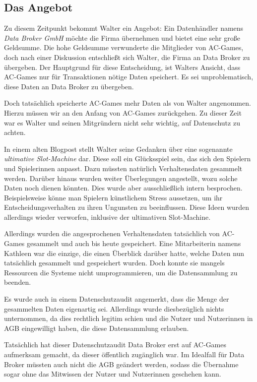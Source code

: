 \subsection{Das Angebot}

Zu diesem Zeitpunkt bekommt Walter ein Angebot:
Ein Datenhändler namens \emph{Data Broker GmbH} möchte die Firma übernehmen und bietet eine sehr große Geldsumme.
Die hohe Geldsumme verwunderte die Mitglieder von AC-Games,
doch nach einer Diskussion entschließt sich Walter, die Firma an Data Broker zu übergeben.
Der Hauptgrund für diese Entscheidung, ist Walters Ansicht, dass AC-Games nur für Transaktionen nötige Daten speichert.
Es sei unproblematisch, diese Daten an Data Broker zu übergeben.

Doch tatsächlich speicherte AC-Games mehr Daten als von Walter angenommen.
Hierzu müssen wir an den Anfang von AC-Games zurückgehen.
Zu dieser Zeit war es Walter und seinen Mitgründern nicht sehr wichtig, auf Datenschutz zu achten.

In einem alten Blogpost stellt Walter seine Gedanken über eine sogenannte \emph{ultimative Slot-Machine} dar.
Diese soll ein Glücksspiel sein, das sich den Spielern und Spielerinnen anpasst.
Dazu müssten natürlich Verhaltensdaten gesammelt werden.
Darüber hinaus wurden weiter Überlegungen angestellt, wozu solche Daten noch dienen könnten.
Dies wurde aber ausschließlich intern besprochen.
Beispielsweise könne man Spielern künstlichem Stress aussetzen, um ihr Entscheidungsverhalten zu ihren Ungunsten zu beeinflussen.
Diese Ideen wurden allerdings wieder verworfen, inklusive der ultimativen Slot-Machine.

Allerdings wurden die angesprochenen Verhaltensdaten tatsächlich von AC-Games gesammelt und auch bis heute gespeichert.
Eine Mitarbeiterin namens Kathleen war die einzige, die einen Überblick darüber hatte, welche Daten nun tatsächlich gesammelt und gespeichert wurden.
Doch konnte sie mangels Ressourcen die Systeme nicht umprogrammieren, um die Datensammlung zu beenden.

Es wurde auch in einem Datenschutzaudit angemerkt, dass die Menge der gesammelten Daten eigenartig sei.
Allerdings wurde diesbezüglich nichts unternommen, da dies rechtlich legitim schien
und die Nutzer und Nutzerinnen in AGB eingewilligt haben, die diese Datensammlung erlauben.

Tatsächlich hat dieser Datenschutzaudit Data Broker erst auf AC-Games aufmerksam gemacht, da dieser öffentlich zugänglich war.
Im Idealfall für Data Broker müssten auch nicht die AGB geändert werden, 
sodass die Übernahme sogar ohne das Mitwissen der Nutzer und Nutzerinnen geschehen kann. 

